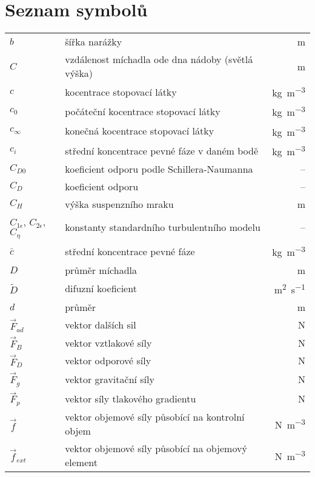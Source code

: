 \chapter*{Seznam symbolů}

\renewcommand\arraystretch{1.5}
\begin{tabularx}{\textwidth}{@{}p{2.5cm} X r@{}}

$b$ & šířka narážky & \si{\meter} \\
$C$ & vzdálenost míchadla ode dna nádoby (světlá výška) & \si{\meter} \\
$c$ & kocentrace stopovací látky & \si{\kilogram\per\cubic\meter} \\
$c_{0}$ & počáteční kocentrace stopovací látky & \si{\kilogram\per\cubic\meter} \\
$c_{\infty}$ & konečná kocentrace stopovací látky & \si{\kilogram\per\cubic\meter} \\
$c_{i}$ & střední koncentrace pevné fáze v daném bodě & \si{\kilogram\per\cubic\meter} \\
$C_{D0}$ & koeficient odporu podle Schillera-Naumanna & -- \\ 
$C_{D}$ & koeficient odporu &  -- \\
$C_{H}$ & výška suspenzního mraku & \si{\meter} \\
$C_{1\epsilon}$, $C_{2\epsilon}$, $C_{\eta}$ & konstanty standardního \keps{} turbulentního modelu & -- \\
$\bar{c}$ & střední koncentrace pevné fáze & \si{\kilogram\per\cubic\meter} \\
$D$ & průměr míchadla & \si{\meter} \\
$\tilde{D}$ & difuzní koeficient & \si{\meter\squared\per\second} \\
$d$ & průměr & \si{\meter} \\
$\vec{F}_{ad}$ & vektor dalších sil & \si{\newton} \\
$\vec{F}_{B}$ & vektor vztlakové síly & \si{\newton} \\
$\vec{F}_{D}$ & vektor odporové síly & \si{\newton} \\
$\vec{F}_{g}$ & vektor gravitační síly & \si{\newton} \\
$\vec{F}_{p}$ & vektor síly tlakového gradientu & \si{\newton} \\
$\vec{f}$ & vektor objemové síly působící na kontrolní objem & \si{\newton\per\cubic\meter} \\
$\vec{f}_{ext}$ & vektor objemové síly působící na objemový element & \si{\newton\per\cubic\meter} \\

\end{tabularx}
